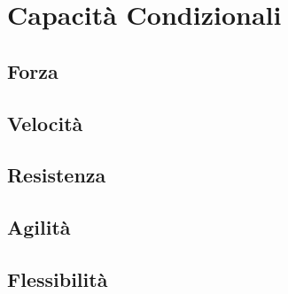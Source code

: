 \documentclass[../uefaC.tex]{subfiles}
\begin{document}
\section{Capacità Condizionali}

\subsection{Forza}

\subsection{Velocità}

\subsection{Resistenza}

\subsection{Agilità}

\subsection{Flessibilità}
\end{document}
